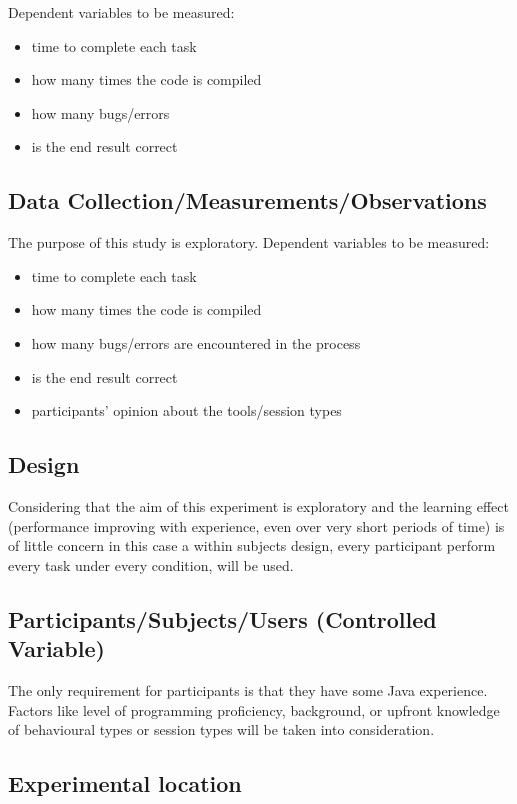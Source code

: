 \documentclass[11pt,notitlepage]{article}
\begin{document}
Dependent variables to be measured:
\begin{itemize}
  \item time to complete each task
  \item how many times the code is compiled
  \item how many bugs/errors
  \item is the end result correct
\end{itemize}

\subsection{Data Collection/Measurements/Observations}
The purpose of this study is exploratory.
Dependent variables to be measured:
\begin{itemize}
  \item time to complete each task
  \item how many times the code is compiled
  \item how many bugs/errors are encountered in the process
  \item is the end result correct
  \item participants' opinion about the tools/session types
\end{itemize}


\subsection{Design}

Considering that the aim of this experiment is exploratory and the learning effect (performance improving with experience, even over very short periods of time) is of little concern in this case a within subjects design, every participant perform every task under every condition, will be used.

\subsection{Participants/Subjects/Users (Controlled Variable)}

The only requirement for participants is that they have some Java experience. Factors like level of programming proficiency, background, or upfront knowledge of behavioural types or session types will be taken into consideration.

\subsection{Experimental location}
\end{document}
